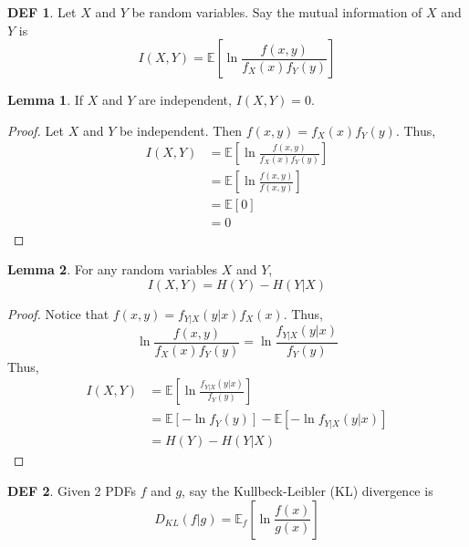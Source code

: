 \documentclass{article}
\theoremstyle{definition}\newtheorem{definition}{DEF}
\theoremstyle{definition}\newtheorem{example}{Ex}
\theoremstyle{lemma}\newtheorem{lemma}{Lemma}
\theoremstyle{corrolary}\newtheorem{corrolary}{Cor}
\begin{document}
\begin{definition}
Let $X$ and $Y$ be random variables.
Say the mutual information of $X$ and $Y$ is
\begin{equation}
I(X,Y) = \mathbb{E} \left[ \ln \frac{f(x,y)}{f_X(x)f_Y(y)}\right]
\end{equation}
\end{definition}

\begin{lemma}
If $X$ and $Y$ are independent, $I(X,Y)=0$.
\end{lemma}
\begin{proof}
Let $X$ and $Y$ be independent.
Then $f(x,y) = f_X(x)f_Y(y)$.
Thus,
\begin{align*}
I(X, Y)
&= \mathbb{E} \left[ \ln \frac{f(x,y)}{f_X(x)f_Y(y)}\right] \\
&= \mathbb{E} \left[ \ln \frac{f(x,y)}{f(x,y)} \right] \\
&= \mathbb{E}\left[ 0 \right] \\
&= 0
\end{align*}
\end{proof}

\begin{lemma}
For any random variables $X$ and $Y$,
\begin{equation}
I(X,Y) = H(Y) - H(Y|X)
\end{equation}
\end{lemma}
\begin{proof}
Notice that $f(x,y) = f_{Y|X}(y|x) f_X(x)$.
Thus,
\begin{equation*}
\ln \frac{f(x,y)}{f_X(x)f_Y(y)} = \ln \frac{f_{Y|X}(y|x)}{f_Y(y)}
\end{equation*}
Thus,
\begin{align*}
I(X,Y)
&= \mathbb{E}\left[ \ln \frac{f_{Y|X}(y|x)}{f_Y(y)} \right] \\
&= \mathbb{E}\left[-\ln f_Y(y)\right] - \mathbb{E}\left[ -\ln f_{Y|X} (y|x)\right] \\
&= H(Y) - H(Y|X)
\end{align*}
\end{proof}

\begin{definition}
Given 2 PDFs $f$ and $g$, say the Kullbeck-Leibler (KL) divergence is
\begin{equation}
D_{KL} (f|g) = \mathbb{E}_f\left[ \ln \frac{f(x)}{g(x)}\right]
\end{equation}
\end{definition}
\end{document}
